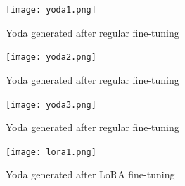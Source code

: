 \documentclass[conference]{IEEEtran}
\begin{document}






\begin{figure}
\centerline{\texttt{[image: yoda1.png]}}
\caption{Yoda generated after regular fine-tuning}
\label{yoda1}
\end{figure}

\begin{figure}
\centerline{\texttt{[image: yoda2.png]}}
\caption{Yoda generated after regular fine-tuning}
\label{yoda2}
\end{figure}

\begin{figure}
\centerline{\texttt{[image: yoda3.png]}}
\caption{Yoda generated after regular fine-tuning}
\label{yoda3}
\end{figure}

\begin{figure}
\centerline{\texttt{[image: lora1.png]}}
\caption{Yoda generated after LoRA fine-tuning}
\label{lora1}
\end{figure}
\end{document}
